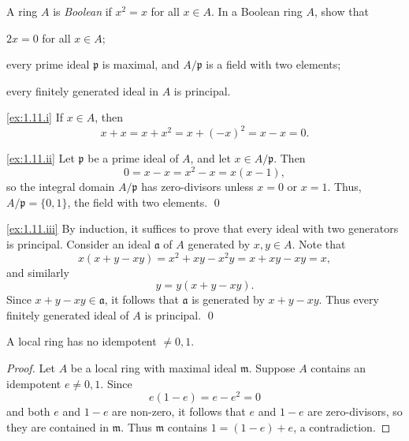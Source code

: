 \begin{exercise}
\label{ex:1.11}
A ring $A$ is \emph{Boolean} if $x^2 = x$ for all $x \in A$.
In a Boolean ring $A$, show that
\begin{rlist}
\item
\label{ex:1.11.i}
$2x = 0$ for all $x\in A$;
\item
\label{ex:1.11.ii}
every prime ideal $\mathfrak p$ is maximal, and $A/\mathfrak p$ is a field with two elements;
\item
\label{ex:1.11.iii}
every finitely generated ideal in $A$ is principal.
\end{rlist}
\end{exercise}

\noindent
\ref{ex:1.11.i}
If $x \in A$, then
\begin{equation*}
\tag*{\qed}
x + x = x + x^2 = x + (-x)^2 = x - x = 0.
\end{equation*}

\noindent
\ref{ex:1.11.ii}
Let $\mathfrak p$ be a prime ideal of $A$, and let $x \in A/\mathfrak p$.
Then
\begin{equation*}
0 = x - x = x^2 - x = x(x - 1),
\end{equation*}
so the integral domain $A/\mathfrak p$ has zero-divisors unless $x=0$ or $x=1$.
Thus, $A / \mathfrak p = \{0,1\}$, the field with two elements.
\qed

\noindent
\ref{ex:1.11.iii}
By induction, it suffices to prove that every ideal with two generators is principal.
Consider an ideal $\mathfrak a$ of $A$ generated by $x,y\in A$.
Note that
\begin{equation*}
x(x + y - x y) = x^2 + x y - x^2 y = x + x y - x y = x,
\end{equation*}
and similarly
\begin{equation*}
y = y(x + y - xy).
\end{equation*}
Since $x + y - xy \in \mathfrak a$, it follows that $\mathfrak a$ is generated by $x + y - xy$.
Thus every finitely generated ideal of $A$ is principal.
\qed

\begin{exercise}
\label{ex:1.12}
A local ring has no idempotent $\neq 0,1$.
\end{exercise}

\begin{proof}
Let $A$ be a local ring with maximal ideal $\mathfrak m$.
Suppose $A$ contains an idempotent $e\neq 0,1$.
Since
\begin{equation*}
e(1-e) = e - e^2 = 0
\end{equation*}
and both $e$ and $1-e$ are non-zero, it follows that $e$ and $1 - e$ are zero-divisors, so they are contained in $\mathfrak m$.
Thus $\mathfrak m$ contains $1 = (1 - e) + e$, a contradiction.
\end{proof}




